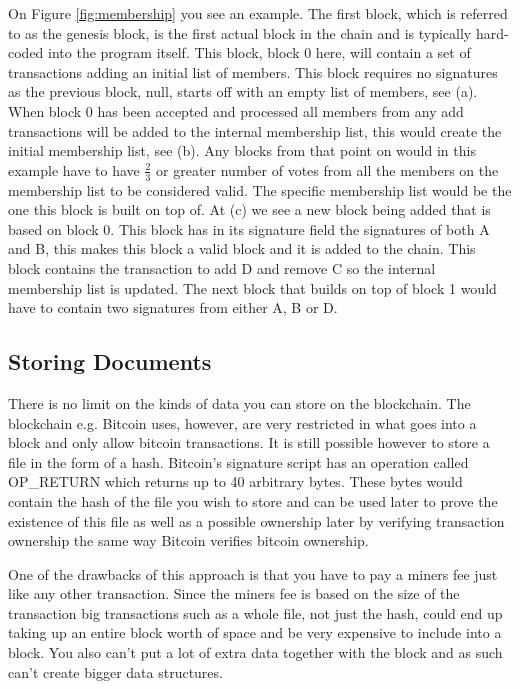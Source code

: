 \documentclass[11pt]{article}
\begin{document}

On Figure \ref{fig:membership} you see an example. The first block, which is referred to as the genesis block, is the first actual block in the chain and is typically hard-coded into the program itself. This block, block 0 here, will contain a set of transactions adding an initial list of members. This block requires no signatures as the previous block, null, starts off with an empty list of members, see (a). When block 0 has been accepted and processed all members from any add transactions will be added to the internal membership list, this would create the initial membership list, see (b). Any blocks from that point on would in this example have to have $\frac{2}{3}$ or greater number of votes from all the members on the membership list to be considered valid. The specific membership list would be the one this block is built on top of. At (c) we see a new block being added that is based on block 0. This block has in its signature field the signatures of both A and B, this makes this block a valid block and it is added to the chain. This block contains the transaction to add D and remove C so the internal membership list is updated. The next block that builds on top of block 1 would have to contain two signatures from either A, B or D.

\subsection{Storing Documents}

There is no limit on the kinds of data you can store on the blockchain. The blockchain e.g. Bitcoin uses, however, are very restricted in what goes into a block and only allow bitcoin transactions. It is still possible however to store a file in the form of a hash. Bitcoin's signature script has an operation called OP\_RETURN which returns up to 40 arbitrary bytes. These bytes would contain the hash of the file you wish to store and can be used later to prove the existence of this file as well as a possible ownership later by verifying transaction ownership the same way Bitcoin verifies bitcoin ownership.

One of the drawbacks of this approach is that you have to pay a miners fee just like any other transaction. Since the miners fee is based on the size of the transaction big transactions such as a whole file, not just the hash, could end up taking up an entire block worth of space and be very expensive to include into a block. You also can't put a lot of extra data together with the block and as such can't create bigger data structures.
\end{document}
